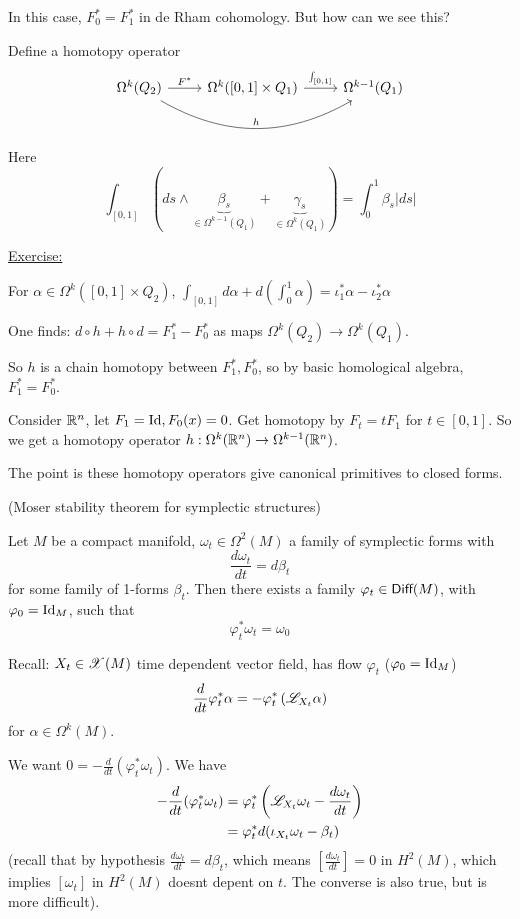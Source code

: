 \documentclass[x11names,reqno,14pt]{extarticle}
\newcommand{\dd}[2]{\frac{d#1}{d#2}}
\begin{document}
In this case, $F_0^* = F_1^*$ in de Rham cohomology. But how can we see this? 

Define a homotopy operator
\[
\begin{tikzcd}
\Omega^k(Q_2) \ar[rr, bend right = 30, "h"]\ar[r, "F^*"] & \Omega^k([0,1]\times Q_1) \ar[r, "\int_{[0,1]}"] & \Omega^{k-1}(Q_1)
\end{tikzcd}
\]
Here 
\[
\int_{[0,1]}(ds\wedge\underbrace{\beta_s}_{\in \Omega^{k-1}(Q_1)} + \underbrace{\gamma_s}_{\in\Omega^k(Q_1)}) = \int_0^1\beta_s|ds|
\]

\underline{Exercise:}

For $\alpha\in\Omega^k([0,1]\times Q_2)$, $\int_{[0,1]}d\alpha + d\left(\int_0^1\alpha\right) = \iota_1^*\alpha - \iota_2^*\alpha$

One finds: $d\circ h + h\circ d = F_1^* - F_0^*$ as maps $\Omega^k(Q_2) \to \Omega^k(Q_1)$. 

So $h$ is a chain homotopy between $F_1^*,F_0^*$, so by basic homological algebra, $F_1^* = F_0^*$.

\exm

Consider $\mathbb{R}^n$, let $F_1 = \operatorname{\mathrm{Id}}, F_0(x) = 0$. Get homotopy by $F_t = tF_1$ for $t \in [0,1]$. So we get a homotopy operator $h:\Omega^k(\mathbb{R}^n)\to\Omega^{k-1}(\mathbb{R}^n)$.

The point is these homotopy operators give canonical primitives to closed forms. 

\thm(Moser stability theorem for symplectic structures)

Let $M$ be a compact manifold, $\omega_t\in\Omega^2(M)$ a family of symplectic forms with 
\[
\dd{\omega_t}{t} = d\beta_t
\]
for some family of 1-forms $\beta_t$. Then there exists a family $\varphi_t \in {{\text{\sffamily {Diff}}}}(M)$, with $\varphi_0=\operatorname{\mathrm{Id}}_M$, such that
\[
\varphi_t^*\omega_t = \omega_0
\]
\proof

Recall: $X_t \in \mathscr{X}(M)$ time dependent vector field, has flow $\varphi_t$ ($\varphi_0=\operatorname{\mathrm{Id}}_M$)
\[
\dd{}{t}\varphi_t^*\alpha = -\varphi_t^*\left(\ms{L}_{X_t}\alpha\right)
\]
for $\alpha \in \Omega^k(M)$.

We want $0 = -\dd{}{t}(\varphi_t^*\omega_t)$. We have
\begin{align*}
-\dd{}{t}(\varphi_t^*\omega_t) & = \varphi_t^*\left(\ms{L}_{X_t}\omega_t - \dd{\omega_t}{t}\right) \\
& = \varphi_t^*d(\iota_{X_t}\omega_t -\beta_t) 
\end{align*}
(recall that by hypothesis $\dd{\omega_t}{t} = d\beta_t$, which means $[\dd{\omega_t}{t}] = 0$ in $H^2(M)$, which implies $[\omega_t]$ in $H^2(M)$ doesnt depent on $t$. The converse is also true, but is more difficult).
\end{document}
